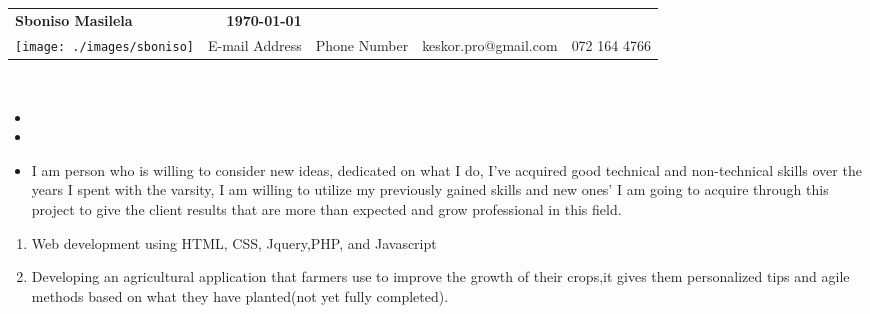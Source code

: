 %
\\ \\

\begin{tabular*}{6.5in}{l@{\extracolsep{\fill}}r}
\textbf{\Large } \textbf{Sboniso Masilela} & \textbf{\today} \\
\texttt{[image: ./images/sboniso]} & E-mail
Address & Phone Number & keskor.pro@gmail.com & 072 164 4766
\end{tabular*}
\\

\begin{itemize}

\item {}

\item {}

\end{itemize}


\begin{itemize}
 \item %
 I am person who is willing to consider new ideas, dedicated on what I do, I've acquired good technical and non-technical skills
 over the years I spent with the varsity, I am willing to utilize my previously gained skills and new ones' I am going to acquire through
 this project to give the client results that are more than expected and grow professional in this field.
\end{itemize}



\begin{enumerate}
 \item Web development using HTML, CSS, Jquery,PHP, and Javascript 
 \item Developing an agricultural application that farmers use to improve the growth of their crops,it gives them personalized tips
 and agile methods based on what they have planted(not yet fully completed).

\end{enumerate}

